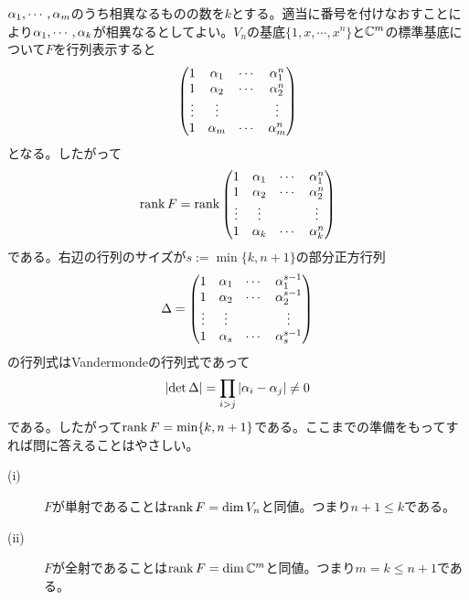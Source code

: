 \subsubsection{}%
\begin{sol}
  ${\alpha}_1, \cdots , {\alpha}_m$のうち相異なるものの数を$k$とする。適当に番号を付けなおすことにより${\alpha}_1, \cdots , {\alpha}_k$が相異なるとしてよい。$V_n$の基底$\{1,x , \cdots , x^n\}$と${\mathbb C}^m$の標準基底について$F$を行列表示すると
  \[
  \begin{pmatrix}  1 & {\alpha}_1 & \cdots &  {\alpha}_1^n \\  1 & {\alpha}_2 & \cdots &  {\alpha}_2^n \\ \vdots & \vdots & & \vdots \\ 1 & {\alpha}_m & \cdots &  {\alpha}_m^n \end{pmatrix}
  \]
  となる。したがって
  \[
  \operatorname{rank} F = \operatorname{rank} \begin{pmatrix}  1 & {\alpha}_1 & \cdots &  {\alpha}_1^n \\  1 & {\alpha}_2 & \cdots &  {\alpha}_2^n \\ \vdots & \vdots & & \vdots \\ 1 & {\alpha}_k & \cdots &  {\alpha}_k^n \end{pmatrix}
  \]
  である。右辺の行列のサイズが$s := \min\{ k,n+1 \}$の部分正方行列
  \[
  {\Delta} = \begin{pmatrix}  1 & {\alpha}_1 & \cdots &  {\alpha}_1^{s-1} \\  1 & {\alpha}_2 & \cdots &  {\alpha}_2^{s-1} \\ \vdots & \vdots & & \vdots \\ 1 & {\alpha}_s & \cdots &  {\alpha}_s^{s-1} \end{pmatrix}
  \]
  の行列式はVandermondeの行列式であって
  \[
  \left \lvert \det {\Delta} \right \rvert = \prod_{i > j} \left \lvert  {\alpha}_i - {\alpha}_j  \right \rvert \neq 0
  \]
  である。したがって$\operatorname{rank} F = \min\{ k,n+1 \}$である。ここまでの準備をもってすれば問に答えることはやさしい。
  \begin{description}
    \item[(i)] $F$が単射であることは$\operatorname{rank} F = \dim V_n$と同値。つまり$n+1 \leq k$である。
    \item[(ii)] $F$が全射であることは$\operatorname{rank} F = \dim {\mathbb C}^m$と同値。つまり$m = k \leq n+1$である。
  \end{description}

\end{sol}
